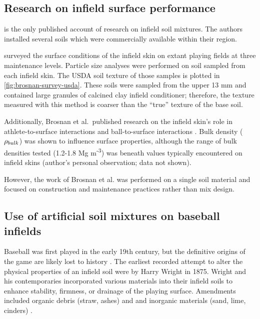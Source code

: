 \documentclass[
]{book}
\begin{document}
\hypertarget{research-on-infield-surface-performance}{%
\subsection{Research on infield surface performance}\label{research-on-infield-surface-performance}}

\citet{Goodall2005} is the only published account of research on infield soil mixtures. The authors installed several soils which were commercially available within their region.

\citet{Brosnan2008a} surveyed the surface conditions of the infield skin on extant playing fields at three maintenance levels. Particle size analyses were performed on soil sampled from each infield skin. The USDA soil texture of those samples is plotted in \ref{fig:brosnan-survey-usda}. These soils were sampled from the upper 13 mm and contained large granules of calcined clay infield conditioner; therefore, the texture measured with this method is coarser than the ``true'' texture of the base soil.

Additionally, Brosnan et al.~published research on the infield skin's role in athlete-to-surface interactions \citeyearpar{Brosnan2009} and ball-to-surface interactions \citeyearpar{Brosnan2011}. Bulk density (\(\Large{\rho}\small{_{bulk}}\)) was shown to influence surface properties, although the range of bulk densities tested (1.2-1.8 Mg m\textsuperscript{-3}) was beneath values typically encountered on infield skins (author's personal observation; data not shown).

However, the work of Brosnan et al. \citetext{\citeyear{Brosnan2009}; \citeyear{Brosnan2011}} was performed on a single soil material and focused on construction and maintenance practices rather than mix design.

\hypertarget{use-of-artificial-soil-mixtures-on-baseball-infields}{%
\subsection{Use of artificial soil mixtures on baseball infields}\label{use-of-artificial-soil-mixtures-on-baseball-infields}}

Baseball was first played in the early 19th century, but the definitive origins of the game are likely lost to history \citep{Walker1994}. The earliest recorded attempt to alter the physical properties of an infield soil were by Harry Wright in 1875. Wright and his contemporaries incorporated various materials into their infield soils to enhance stability, firmness, or drainage of the playing surface. Amendments included organic debris (straw, ashes) and and inorganic materials (sand, lime, cinders) \citep{Morris2007}.
\end{document}
